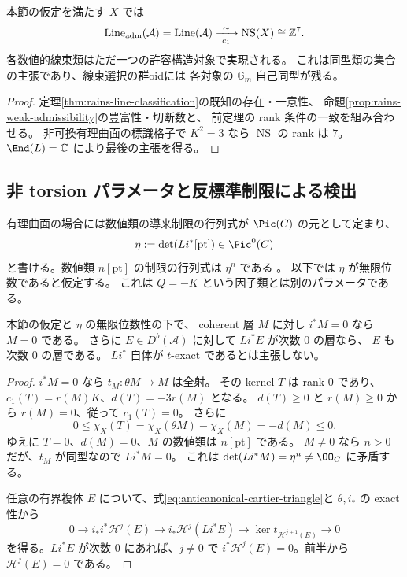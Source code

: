\begin{corollary}[全弱標識の数値的分類]\label{cor:rains-all-weak-markings}
本節の仮定を満たす $X$ では
\[
 \operatorname{Line}_{\rm adm}(\mathcal A)
 =\operatorname{Line}(\mathcal A)
 \xrightarrow[\ c_1\ ]{\sim}\operatorname{NS}(X)\cong\mathbb Z^7.
\]
各数値的線束類はただ一つの許容構造対象で実現される。
これは同型類の集合の主張であり、線束選択の群oidには
各対象の $\mathbb G_m$ 自己同型が残る。
\end{corollary}
\begin{proof}
定理\ref{thm:rains-line-classification}の既知の存在・一意性、
命題\ref{prop:rains-weak-admissibility}の豊富性・切断数と、
前定理の rank 条件の一致を組み合わせる。
非可換有理曲面の標識格子で $K^2=3$ なら $\operatorname{NS}$ の rank は $7$。
$\End(L)=\mathbb C$ により最後の主張を得る。
\end{proof}

\subsection{非 torsion パラメータと反標準制限による検出}
有理曲面の場合には数値類の導来制限の行列式が $\Pic(C)$ の元として定まり、
\begin{equation}\label{eq:restriction-period-eta}
 \eta:=\det(Li^*[\mathrm{pt}])\in\Pic^0(C)
\end{equation}
と書ける。数値類 $n[\mathrm{pt}]$ の制限の行列式は $\eta^n$ である
\cite[Proposition 7.24 の直前の議論]{RainsBir}。
以下では $\eta$ が無限位数であると仮定する。
これは $Q=-K$ という因子類とは別のパラメータである。

\begin{theorem}[反標準制限による層の検出]\label{thm:restriction-detects-heart}
本節の仮定と $\eta$ の無限位数性の下で、
coherent 層 $M$ に対し $i^*M=0$ なら $M=0$ である。
さらに $E\in D^b(\mathcal A)$ に対して $Li^*E$ が次数 $0$ の層なら、
$E$ も次数 $0$ の層である。
$Li^*$ 自体が $t$-exact であるとは主張しない。
\end{theorem}
\begin{proof}
$i^*M=0$ なら $t_M:\theta M\to M$ は全射。
その kernel $T$ は rank $0$ であり、
$c_1(T)=r(M)K$、$d(T)=-3r(M)$ となる。
$d(T)\ge0$ と $r(M)\ge0$ から $r(M)=0$、従って $c_1(T)=0$。
さらに
\[
 0\le\chi_X(T)=\chi_X(\theta M)-\chi_X(M)=-d(M)\le0.
\]
ゆえに $T=0$、$d(M)=0$、$M$ の数値類は $n[\mathrm{pt}]$ である。
$M\ne0$ なら $n>0$ だが、$t_M$ が同型なので $Li^*M=0$。
これは $\det(Li^*M)=\eta^n\ne\OO_C$ に矛盾する。

任意の有界複体 $E$ について、式\eqref{eq:anticanonical-cartier-triangle}と
$\theta,i_*$ の exact 性から
\begin{equation}\label{eq:restriction-cohomology-detection}
 0\longrightarrow i_*i^*\mathcal H^j(E)
 \longrightarrow i_*\mathcal H^j(Li^*E)
 \longrightarrow\ker t_{\mathcal H^{j+1}(E)}\longrightarrow0
\end{equation}
を得る。$Li^*E$ が次数 $0$ にあれば、$j\ne0$ で
$i^*\mathcal H^j(E)=0$。前半から $\mathcal H^j(E)=0$ である。
\end{proof}

